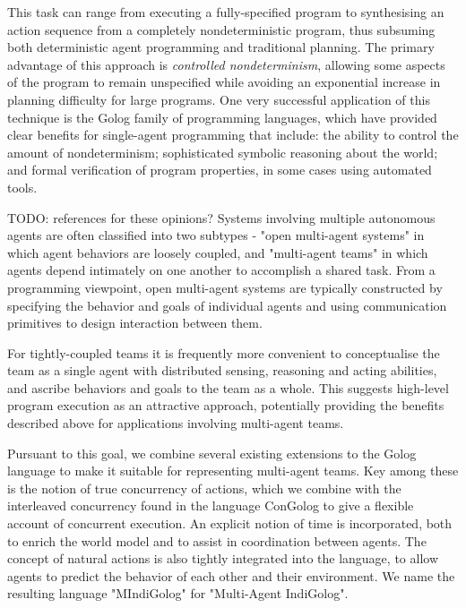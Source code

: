 \documentclass[letterpaper]{article}
\begin{document}
This task can range from executing a fully-specified program to synthesising
an action sequence from a completely nondeterministic program, thus
subsuming both deterministic agent programming and traditional planning.
The primary advantage of this approach is \emph{controlled nondeterminism},
allowing some aspects of the program to remain unspecified while avoiding
an exponential increase in planning difficulty for large programs.
One very successful application of this technique is the Golog \cite{levesque97golog}
family of programming languages, which have provided clear benefits
for single-agent programming that include: the ability to control
the amount of nondeterminism; sophisticated symbolic reasoning about
the world; and formal verification of program properties, in some
cases using automated tools.

TODO: references for these opinions? Systems involving multiple autonomous
agents are often classified into two subtypes - "open multi-agent
systems" in which agent behaviors are loosely coupled, and "multi-agent
teams" in which agents depend intimately on one another to accomplish
a shared task. From a programming viewpoint, open multi-agent systems
are typically constructed by specifying the behavior and goals of
individual agents and using communication primitives to design interaction
between them.

For tightly-coupled teams it is frequently more convenient to conceptualise
the team as a single agent with distributed sensing, reasoning and
acting abilities, and ascribe behaviors and goals to the team as a
whole. This suggests high-level program execution as an attractive
approach, potentially providing the benefits described above for applications
involving multi-agent teams.

Pursuant to this goal, we combine several existing extensions to the
Golog language to make it suitable for representing multi-agent teams.
Key among these is the notion of true concurrency of actions, which
we combine with the interleaved concurrency found in the language
ConGolog \cite{giacomo00congolog} to give a flexible account of concurrent
execution. An explicit notion of time is incorporated, both to enrich
the world model and to assist in coordination between agents. The
concept of natural actions \cite{reiter96sc_nat_conc} is also tightly
integrated into the language, to allow agents to predict the behavior
of each other and their environment. We name the resulting language
"MIndiGolog" for "Multi-Agent IndiGolog".
\end{document}
